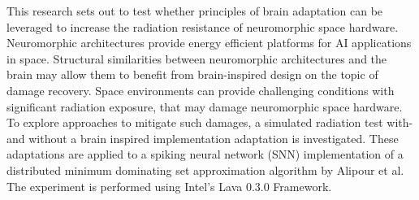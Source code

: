   This research sets out to test whether principles of brain adaptation can be leveraged to increase the radiation resistance of neuromorphic space hardware. Neuromorphic architectures provide energy efficient platforms for AI applications in space. Structural similarities between neuromorphic architectures and the brain may allow them to benefit from brain-inspired design on the topic of damage recovery. Space environments can provide challenging conditions with significant radiation exposure, that may damage neuromorphic space hardware. To explore approaches to mitigate such damages, a simulated radiation test with- and without a brain inspired implementation adaptation is investigated. These adaptations are applied to a spiking neural network (SNN) implementation of a distributed minimum dominating set approximation algorithm by Alipour et al. The experiment is performed using Intel's Lava 0.3.0 Framework.
